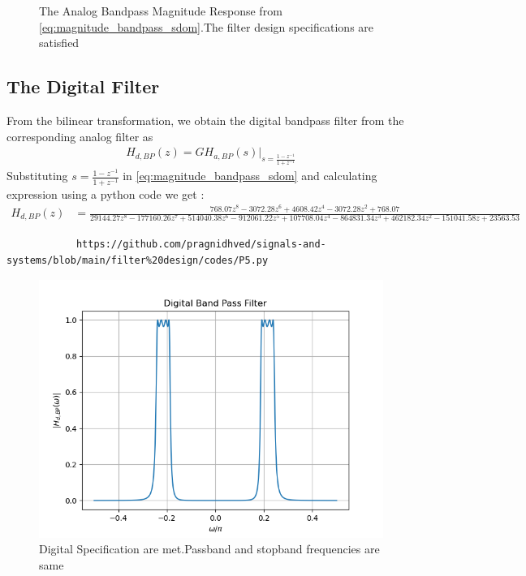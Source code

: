 \documentclass{article}
\begin{document}
\begin{enumerate}
\begin{figure}[htbp]
			\caption{The Analog Bandpass Magnitude Response from \eqref{eq:magnitude_bandpass_sdom}.The filter design specifications are satisfied}
			\label{fig:band_pass_filter}
		\end{figure}
		
		\subsection{The Digital Filter}
		
		From the bilinear transformation, we obtain the digital bandpass filter from the corresponding analog filter as
		\begin{align}
			H_{d,BP}(z) = GH_{a,BP}(s)\vert_{s = \frac{1-z^{-1}}{1 + z^{-1}}}
		\end{align}
		Substituting $s=\frac{1-z^{-1}}{1+z^{-1}}$ in \eqref{eq:magnitude_bandpass_sdom} and calculating expression using a python code we get :
		\begin{align}
			H_{d,BP}(z) &= \frac{768.07z^8 -3072.28z^6 + 4608.42z^4 - 3072.28z^2 + 768.07}{29144.27z^8 - 177160.26z^7 + 514040.38z^6 - 912061.22z^5 + 107708.04z^4 - 864831.34z^3 + 462182.34z^2 - 151041.58z + 23563.53}
		\end{align}
		\begin{lstlisting}
			https://github.com/pragnidhved/signals-and-systems/blob/main/filter%20design/codes/P5.py
		\end{lstlisting}
		\begin{figure}[htbp]
			\centering
			\includegraphics[width=1\linewidth]{figs/fig5}
			\caption{Digital Specification are met.Passband and stopband frequencies are same}
			\label{fig:digitial_band_pass_filter}
		\end{figure}
	\end{enumerate}
	
\end{document}
